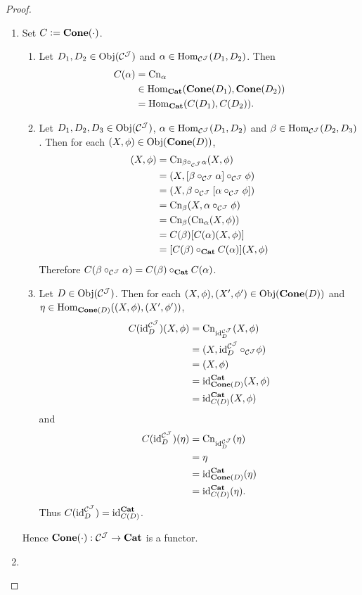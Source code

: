 \documentclass{book}
\begin{document}
	\begin{proof}\
		\begin{enumerate}
			\item Set $C \defeq \bCone(\cdot)$.
			\begin{enumerate}
				\item Let $D_1, D_2 \in \Obj(\MC^{\MJ})$ and $\al \in \Hom_{\MC^{\MJ}}(D_1, D_2)$. Then 
				\begin{align*}
					C(\al)
					& = \Cn_{\al} \\
					& \in \Hom_{\bCat}(\bCone(D_1), \bCone(D_2)) \\
					& = \Hom_{\bCat}(C(D_1), C(D_2)).
				\end{align*}
				\item Let $D_1, D_2, D_3 \in \Obj(\MC^{\MJ})$, $\al \in \Hom_{\MC^{\MJ}}(D_1, D_2)$ and $\be \in \Hom_{\MC^{\MJ}}(D_2, D_3)$. Then for each $(X, \phi) \in \Obj(\bCone(D))$,
				\begin{align*}
					[C(\be \circ_{\MC^{\MJ}} \al)](X, \phi)
					& = \Cn_{\be \circ_{\MC^{\MJ}} \al} (X, \phi) \\
					& = (X, [\be \circ_{\MC^{\MJ}} \al] \circ_{\MC^{\MJ}} \phi) \\
					& = (X, \be \circ_{\MC^{\MJ}} [\al \circ_{\MC^{\MJ}} \phi]) \\
					& = \Cn_{\be}(X, \al \circ_{\MC^{\MJ}} \phi) \\
					& = \Cn_{\be}(\Cn_{\al}(X, \phi)) \\
					& = C(\be)[C(\al)(X, \phi)] \\
					& = [C(\be) \circ_{\bCat} C(\al)](X, \phi)
				\end{align*} 
				Therefore $C(\be \circ_{\MC^{\MJ}} \al) = C(\be) \circ_{\bCat} C(\al)$.
				\item Let $D \in \Obj(\MC^{\MJ})$. Then for each $(X, \phi), (X', \phi') \in \Obj(\bCone(D))$ and $\eta \in \Hom_{\bCone(D)}((X, \phi), (X', \phi'))$,
				\begin{align*}
					C(\id_D^{\MC^{\MJ}})(X, \phi)
					& = \Cn_{\id_D^{\MC^{\MJ}}}(X, \phi) \\
					& = (X, \id_D^{\MC^{\MJ}} \circ_{\MC^{\MJ}} \phi) \\
					& = (X, \phi) \\
					& = \id_{\bCone(D)}^{\bCat}(X, \phi) \\
					& = \id_{C(D)}^{\bCat}(X, \phi)
				\end{align*}
				and 
				\begin{align*}
					C(\id_D^{\MC^{\MJ}})(\eta)
					& = \Cn_{\id_D^{\MC^{\MJ}}}(\eta) \\
					& = \eta \\
					& = \id_{\bCone(D)}^{\bCat}(\eta) \\
					& = \id_{C(D)}^{\bCat}(\eta).
				\end{align*}
				Thus $C(\id_D^{\MC^{\MJ}}) = \id_{C(D)}^{\bCat}$.
			\end{enumerate}
			Hence $\bCone(\cdot):\MC^{\MJ} \rightarrow \bCat$ is a functor.
			\item {}
		\end{enumerate}
	\end{proof}
\end{document}
